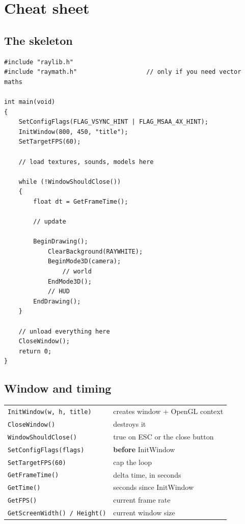 \chapter{Cheat sheet}

\section{The skeleton}

\begin{lstlisting}
#include "raylib.h"
#include "raymath.h"                   // only if you need vector maths

int main(void)
{
    SetConfigFlags(FLAG_VSYNC_HINT | FLAG_MSAA_4X_HINT);
    InitWindow(800, 450, "title");
    SetTargetFPS(60);

    // load textures, sounds, models here

    while (!WindowShouldClose())
    {
        float dt = GetFrameTime();

        // update

        BeginDrawing();
            ClearBackground(RAYWHITE);
            BeginMode3D(camera);
                // world
            EndMode3D();
            // HUD
        EndDrawing();
    }

    // unload everything here
    CloseWindow();
    return 0;
}
\end{lstlisting}

\section{Window and timing}

\begin{center}
\begin{tabular}{@{}ll@{}}
\toprule
\lstinline|InitWindow(w, h, title)| & creates window + OpenGL context \\
\lstinline|CloseWindow()| & destroys it \\
\lstinline|WindowShouldClose()| & true on ESC or the close button \\
\lstinline|SetConfigFlags(flags)| & \textbf{before} InitWindow \\
\lstinline|SetTargetFPS(60)| & cap the loop \\
\lstinline|GetFrameTime()| & delta time, in seconds \\
\lstinline|GetTime()| & seconds since InitWindow \\
\lstinline|GetFPS()| & current frame rate \\
\lstinline|GetScreenWidth() / Height()| & current window size \\
\bottomrule
\end{tabular}
\end{center}

